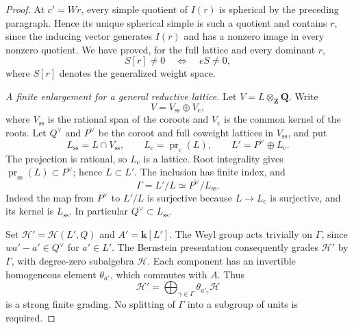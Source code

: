 \begin{proof}
  At $c'=Wr$, every simple quotient of $I(r)$ is spherical by the preceding
  paragraph.  Hence its unique spherical simple is such a quotient and
  contains $r$, since the inducing vector generates $I(r)$ and has a
  nonzero image in every nonzero quotient.  We have proved, for the full
  lattice and every dominant $r$,
  \begin{equation}\label{ext:full-lattice-detector}
    S[r]\ne0\quad\Longleftrightarrow\quad eS\ne0,
  \end{equation}
  where $S[r]$ denotes the generalized weight space.

  \smallskip
  \noindent\emph{A finite enlargement for a general reductive lattice.}
  Let $V=L\otimes_{\mathbf Z}\mathbf Q$.  Write
  \[
    V=V_{\mathrm{ss}}\oplus V_{\mathrm c},
  \]
  where $V_{\mathrm{ss}}$ is the rational span of the coroots and
  $V_{\mathrm c}$ is the common kernel of the roots.  Let $Q^\vee$ and
  $P^\vee$ be the coroot and full coweight lattices in $V_{\mathrm{ss}}$,
  and put
  \[
    L_{\mathrm{ss}}=L\cap V_{\mathrm{ss}},\qquad
    L_{\mathrm c}=\operatorname{pr}_{\mathrm c}(L),\qquad
    L'=P^\vee\oplus L_{\mathrm c}.
  \]
  The projection is rational, so $L_{\mathrm c}$ is a lattice.
  Root integrality gives
  $\operatorname{pr}_{\mathrm{ss}}(L)\subset P^\vee$; hence $L\subset L'$.
  The inclusion has finite index, and
  \begin{equation}\label{ext:lattice-quotient}
    \Gamma=L'/L\simeq P^\vee/L_{\mathrm{ss}}.
  \end{equation}
  Indeed the map from $P^\vee$ to $L'/L$ is surjective because
  $L\to L_{\mathrm c}$ is surjective, and its kernel is
  $L_{\mathrm{ss}}$.  In particular $Q^\vee\subset L_{\mathrm{ss}}$.

  Set $\mathcal H'=\mathcal H(L',Q)$ and $A'=\mathbf k[L']$.
  The Weyl group acts trivially on $\Gamma$, since
  $w a'-a'\in Q^\vee$ for $a'\in L'$.  The Bernstein presentation
  consequently grades $\mathcal H'$ by $\Gamma$, with degree-zero
  subalgebra $\mathcal H$.  Each component has an invertible homogeneous
  element $\theta_{a'}$, which commutes with $A$.  Thus
  \begin{equation}\label{ext:strong-grading}
    \mathcal H'=\bigoplus_{\gamma\in\Gamma}
                   \theta_{a'_{\gamma}}\mathcal H
  \end{equation}
  is a strong finite grading.  No splitting of $\Gamma$ into a subgroup
  of units is required.


\end{proof}
